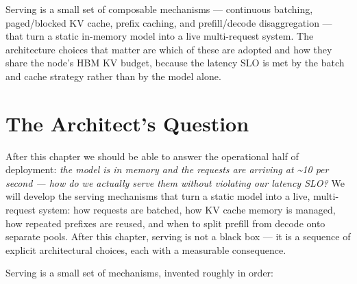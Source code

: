 Serving is a small set of composable mechanisms --- continuous batching,
paged/blocked KV cache, prefix caching, and prefill/decode
disaggregation --- that turn a static in-memory model into a live
multi-request system. The architecture choices that matter are which of
these are adopted and how they share the node's HBM KV budget, because
the latency SLO is met by the batch and cache strategy rather than by
the model alone.

\section*{The Architect's Question}\label{the-architects-question}

After this chapter we should be able to answer the operational half of
deployment: \emph{the model is in memory and the requests are arriving
at \textasciitilde10 per second --- how do we actually serve them
without violating our latency SLO?} We will develop the serving
mechanisms that turn a static model into a live, multi-request system:
how requests are batched, how KV cache memory is managed, how repeated
prefixes are reused, and when to split prefill from decode onto separate
pools. After this chapter, serving is not a black box --- it is a
sequence of explicit architectural choices, each with a measurable
consequence.

\label{concept}


Serving is a small set of mechanisms, invented roughly in order:

